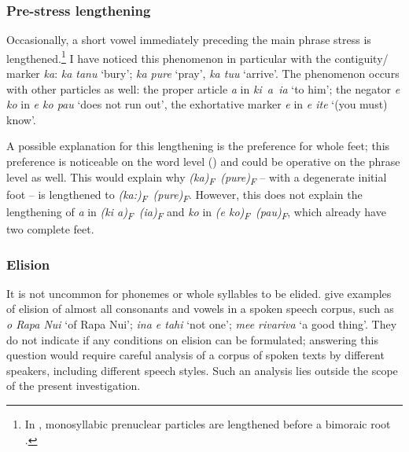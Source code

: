 \subsubsection[Pre{}-stress lengthening]{Pre-stress lengthening}\label{sec:2.5.1.2}
Occasionally, a short vowel immediately preceding the main phrase stress is lengthened.\footnote{\label{fn:62}In , monosyllabic prenuclear particles are lengthened before a bimoraic root \citep{Davletshin2016}.} I have noticed this phenomenon 
in particular with the contiguity/ marker \textit{ka}: \textit{ka tanu} \textstyleIPA{[kaːˈtanu]} ‘bury’; \textit{ka pure} \textstyleIPA{[kaːˈpure]} ‘pray’, \textit{ka tu{\ꞌ}u} \textstyleIPA{[kaːˈtuɁu]} ‘arrive’. The phenomenon occurs with other particles as well: the proper article \textit{a} in \textit{ki~a~ia} \textstyleIPA{\mbox{[kiaːˈia]}} ‘to him’; the negator \textit{e ko} in \textit{e ko pau} \textstyleIPA{[ekoːˈpau]} ‘does not run out’, the exhortative marker \textit{e} in \textit{e {\ꞌ}ite} \textstyleIPA{[eːˈɁite]} ‘(you must) know’. 

A possible explanation for this lengthening is the preference for whole feet; this preference is noticeable on the word level () and could be operative on the phrase level as well. This would explain why \textit{\textup{(}}\textit{ka}\textit{\textup{)}}\textit{\textsubscript{F}}\textit{~}\textit{\textup{(}}\textit{pure}\textit{\textup{)}}\textit{\textsubscript{F}} – with a degenerate initial foot – is lengthened to \textit{\textup{(}}\textit{ka:}\textit{\textup{)}}\textit{\textsubscript{F}}\textit{~}\textit{\textup{(}}\textit{pure}\textit{\textup{)}}\textit{\textsubscript{F}}. However, this does not explain the lengthening of \textit{a} in \textit{\textup{(}}\textit{ki a}\textit{\textup{)}}\textit{\textsubscript{F}}\textit{~}\textit{\textup{(}}\textit{ia}\textit{\textup{)}}\textit{\textsubscript{F}} and \textit{ko} in \textit{\textup{(}}\textit{e ko}\textit{\textup{)}}\textit{\textsubscript{F}}\textit{~}\textit{\textup{(}}\textit{pau}\textit{\textup{)}}\textit{\textsubscript{F}}, which already have two complete feet.

\subsubsection[Elision]{Elision}\label{sec:2.5.1.3}
It is not uncommon for phonemes or whole syllables to be elided. \citet[45–47]{GuerraEissmann1993} give examples of elision of almost all consonants and vowels in a spoken speech corpus, such as \textit{o Rapa Nui} \textstyleIPA{[oˈrapaːi]} ‘of Rapa Nui’; \textit{{\ꞌ}ina e tahi} \textstyleIPA{[inaˈtai]} ‘not one’; \textit{me{\ꞌ}e rivariva} \textstyleIPA{[meːriːˈriːa]} ‘a good thing’. They do not indicate if any conditions on elision can be formulated; answering this question would require careful analysis of a corpus of spoken texts by different speakers, including different speech styles. Such an analysis lies outside the scope of the present investigation.

